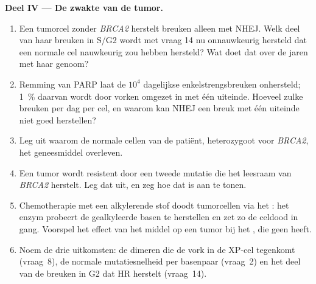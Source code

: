 \begin{problem}
\medskip
\noindent\textbf{Deel IV --- De zwakte van de tumor.}
\begin{enumerate}[resume]
  \item Een tumorcel zonder \emph{BRCA2} herstelt breuken alleen met
        NHEJ. Welk deel van haar breuken in S/G2 wordt met vraag 14
        nu onnauwkeurig hersteld dat een normale cel nauwkeurig zou
        hebben hersteld? Wat doet dat over de jaren met haar genoom?
  \item Remming van PARP laat de $10^{4}$ dagelijkse
        enkelstrengsbreuken onhersteld; \qty{1}{\%} daarvan wordt door
        vorken omgezet in  met één uiteinde.
        Hoeveel zulke breuken per dag per cel, en waarom kan NHEJ een
        breuk met één uiteinde niet goed herstellen?
  \item Leg uit waarom de normale cellen van de patiënt, heterozygoot
        voor \emph{BRCA2}, het geneesmiddel overleven.
  \item Een tumor wordt resistent door een tweede mutatie die het
        leesraam van \emph{BRCA2} herstelt. Leg dat uit, en zeg hoe
        dat is aan te tonen.
  \item Chemotherapie met een alkylerende stof doodt tumorcellen via
        het : het enzym probeert de gealkyleerde basen
        te herstellen en zet zo de celdood in gang. Voorspel het effect
        van het middel op een tumor bij het , die
        geen  heeft.
  \item Noem de drie uitkomsten: de dimeren die de vork in de XP-cel
        tegenkomt (vraag~8), de normale mutatiesnelheid per basenpaar
        (vraag~2) en het deel van de breuken in G2 dat HR herstelt
        (vraag~14).
\end{enumerate}
\end{problem}
